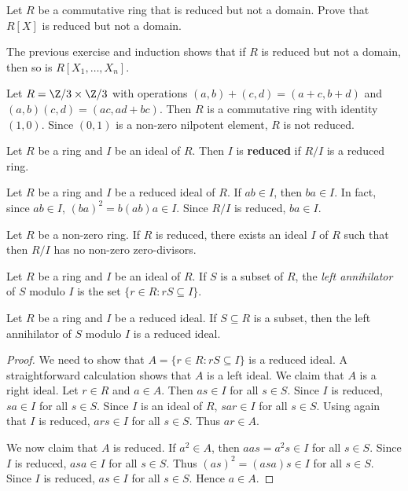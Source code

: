 \begin{exercise}
    \label{xca:reduced_RX}
    Let $R$ be a commutative ring that is reduced but not a domain.
    Prove that $R[X]$ is reduced but not a domain. 
\end{exercise}

The previous exercise and induction 
shows that if $R$ is reduced but not a domain, 
then so is $R[X_1,\dots,X_n]$. 

\begin{example}
    Let $R=\Z/3\times\Z/3$ with
    operations $(a,b)+(c,d)=(a+c,b+d)$ and 
    $(a,b)(c,d)=(ac,ad+bc)$. Then $R$ is a commutative
    ring with identity $(1,0)$. Since 
    $(0,1)$ is a non-zero nilpotent element, $R$ is not reduced. 
\end{example}

\begin{definition}
    Let $R$ be a ring and $I$ be an ideal of $R$. 
    Then $I$ is \textbf{reduced} if $R/I$ is a reduced ring. 
\end{definition}

Let $R$ be a ring and 
$I$ be a reduced ideal of $R$. If $ab\in I$, then 
$ba\in I$. In fact, since $ab\in I$, 
$(ba)^2=b(ab)a\in I$.
Since $R/I$ is reduced, $ba\in I$. 


 \begin{theorem}
 \label{thm:AndrunakevicRjabuhin}
 	Let $R$ be a non-zero ring. If $R$ is reduced, there exists
 	an ideal $I$ of $R$ such that 
 	then $R/I$ has no non-zero zero-divisors. 
 \end{theorem}

 Let $R$ be a ring and $I$ be an ideal of $R$. If $S$ 
 is a subset of $R$, the \emph{left annihilator} of $S$
 modulo $I$ is the set $\{r\in R:rS\subseteq I\}$.  

 \begin{lemma}
    Let $R$ be a ring and $I$ be a reduced ideal. 
    If $S\subseteq R$ is a subset, then 
    the left annihilator of $S$ modulo $I$ 
    is a reduced ideal. 
 \end{lemma}

\begin{proof}
    We need to show that $A=\{r\in R:rS\subseteq I\}$ 
    is a reduced ideal. 
    A straightforward calculation shows that $A$ is 
    a left ideal. We claim that $A$ is a right ideal. Let $r\in R$
    and $a\in A$. Then 
    $as\in I$ for all $s\in S$. Since $I$ is reduced, $sa\in I$ for all $s\in S$. Since 
    $I$ is an ideal of $R$, $sar\in I$
    for all $s\in S$. Using again 
    that $I$ is reduced, 
    $ars\in I$ for all $s\in S$. Thus 
    $ar\in A$. 
    
    We now claim that $A$ is reduced. If $a^2\in A$, then 
    $aas=a^2s\in I$ for all $s\in S$. 
    Since $I$ is reduced, $asa\in I$ for
    all $s\in S$. Thus $(as)^2=(asa)s\in I$ for all $s\in S$. Since $I$ 
    is reduced, $as\in I$ for all $s\in S$. Hence $a\in A$. 
\end{proof}

